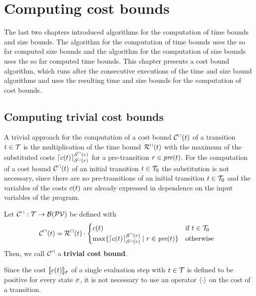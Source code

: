 \section{Computing cost bounds}

The last two chapters introduced algorithms for the computation of time bounds and size bounds.
The algorithm for the computation of time bounds uses the so far computed size bounds and the algorithm for the computation of size bounds uses the so far computed time bounds.
This chapter presents a cost bound algorithm, which runs after the consecutive executions of the time and size bound algorithms and uses the resulting time and size bounds for the computation of cost bounds.

\subsection{Computing trivial cost bounds}

A trivial approach for the computation of a cost bound ${\mathcal{C}^\sqcap}(t)$ of a transition $t \in \mathcal{T}$ is the multiplication of the time bound ${\mathcal{R}^\sqcap}(t)$ with the maximum of the substituted costs $\lceil c(t) \rceil^{{\mathcal{S}^\sqcap}(r)}_{{\mathcal{S}^\sqcup}(r)}$ for a pre-transition $r \in \emph{pre}(t)$.
For the computation of a cost bound ${\mathcal{C}^\sqcap}(t)$ of an initial transition $t \in \mathcal{T}_0$ the substitution is not necessary, since there are no pre-transitions of an initial transition $t \in \mathcal{T}_0$ and the variables of the costs $c(t)$ are already expressed in dependence on the input variables of the program.

\begin{definition}
  Let ${\mathcal{C}^\sqcap}: \mathcal{T} \rightarrow \mathcal{B}(\mathcal{PV})$ be defined with
  \[ {\mathcal{C}^\sqcap}(t) = {\mathcal{R}^\sqcap}(t) \cdot
  \begin{cases}
    c(t) & \text{if } t \in \mathcal{T}_0 \\
    \max \lbrace \lceil c(t) \rceil^{{\mathcal{S}^\sqcap}(r)}_{{\mathcal{S}^\sqcup}(r)} \mid r \in \emph{pre}(t) \rbrace & \text{otherwise }
  \end{cases}
  \]
  Then, we call ${\mathcal{C}^\sqcap}$ a \textbf{trivial cost bound}. 
\end{definition}

Since the cost $\llbracket c(t) \rrbracket_{\sigma}$ of a single evaluation step with $t \in \mathcal{T}$ is defined to be positive for every state $\sigma$, it is not necessary to use an operator $\langle\cdot\rangle$ on the cost of a transition.

\begin{example}

\end{example}


